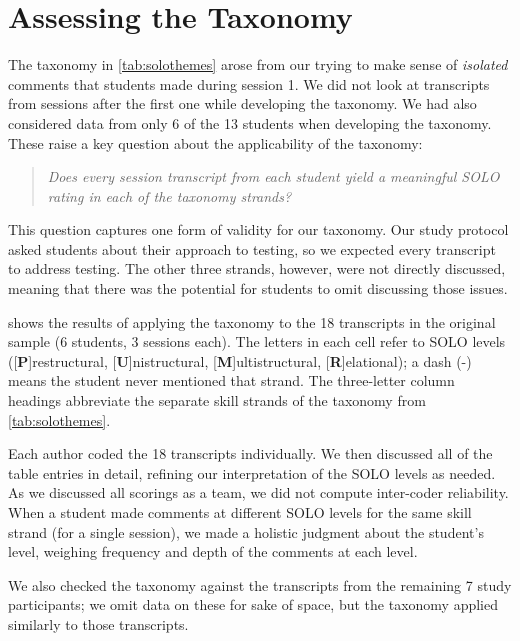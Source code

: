 \section{Assessing the Taxonomy}

The taxonomy in \cref{tab:solothemes} arose from our trying to make sense of
\emph{isolated} comments that students made during session 1.  We did
not look at %
transcripts from sessions after
the first one while developing the taxonomy.
We had also considered
data from only 6 of the 13 students when developing the taxonomy.
These raise a key
question about the applicability of the taxonomy:

\begin{quote}\it
Does every session transcript from each student yield a meaningful SOLO rating in each
of the taxonomy strands?
\end{quote}

\noindent
This question captures one form of validity for our taxonomy.  Our study protocol
asked students about their approach to testing, so we
expected every transcript to address testing.  The other three
strands, however, were not directly discussed, meaning that there was
the potential for students to omit discussing those issues.

 shows the results of applying the taxonomy
to the 18 transcripts in the original sample (6 students, 3 sessions each).
The letters
in each cell refer to SOLO levels ([\textbf{P}]restructural,
[\textbf{U}]nistructural, [\textbf{M}]ultistructural,
[\textbf{R}]elational); a dash (-) means the student never mentioned that
strand. The three-letter column headings abbreviate the
separate skill strands of the taxonomy from \cref{tab:solothemes}.

Each author coded the 18 transcripts
individually. We then discussed all of the table entries in detail,
refining our interpretation of the SOLO levels as needed. As we
discussed all scorings as a team, we did not compute inter-coder reliability.
When a student made comments at different SOLO levels for the same skill strand
(for a single session), we made a holistic judgment about the student's level,
weighing frequency and depth of the comments at each level.

We also checked the taxonomy against the transcripts from the
remaining 7 study participants; we omit data on these for sake of
space, but the taxonomy applied similarly to those transcripts.

